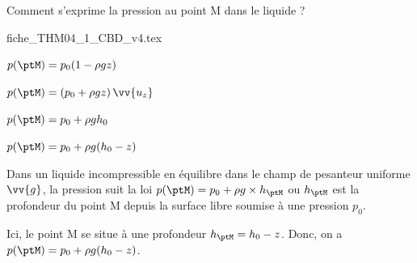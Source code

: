\smallskip

Comment s'exprime la pression au point M dans le liquide ? 

                                \initialisationPartieDroite %
\def\ratioScaleImage{0.6}
\begin{center}
{fiche_THM04_1_CBD_v4.tex}
\end{center}
                               \finalisationDuPartageDePage %

\debutEntrainement


\begin{enonce}	
	\begin{listeQCM2Colonnes}
	\item $p(\ptM)=p_0(1-\rho g z)$
	\item $p(\ptM)=(p_0+\rho g z)\, \vv{u_z}$
	\item $p(\ptM)=p_0+\rho g h_0$
	\item $p(\ptM)=p_0+\rho g (h_0-z)$
	\end{listeQCM2Colonnes}
\end{enonce}

\reponse{\reponseD{}}

\begin{corrige}
Dans un liquide incompressible en équilibre dans le champ de pesanteur uniforme $\vv{g}$, la pression suit la loi $p(\ptM)=p_0+\rho g \times h_\ptM$ ou $h_\ptM$ est la profondeur du point M depuis la surface libre soumise à une pression $p_0$. 

Ici, le point M se situe à une profondeur $h_\ptM=h_0-z$. Donc, on a $p(\ptM)=p_0+\rho g (h_0-z)$.
\end{corrige}


